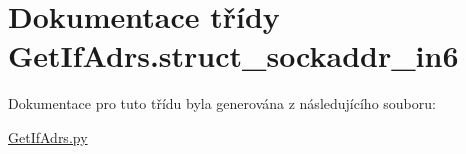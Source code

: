 \hypertarget{classGetIfAdrs_1_1struct__sockaddr__in6}{\section{Dokumentace třídy Get\-If\-Adrs.\-struct\-\_\-sockaddr\-\_\-in6}
\label{d0/df7/classGetIfAdrs_1_1struct__sockaddr__in6}
}


Dokumentace pro tuto třídu byla generována z následujícího souboru\-:\begin{DoxyCompactItemize}
\item 
\hyperlink{GetIfAdrs_8py}{Get\-If\-Adrs.\-py}\end{DoxyCompactItemize}
